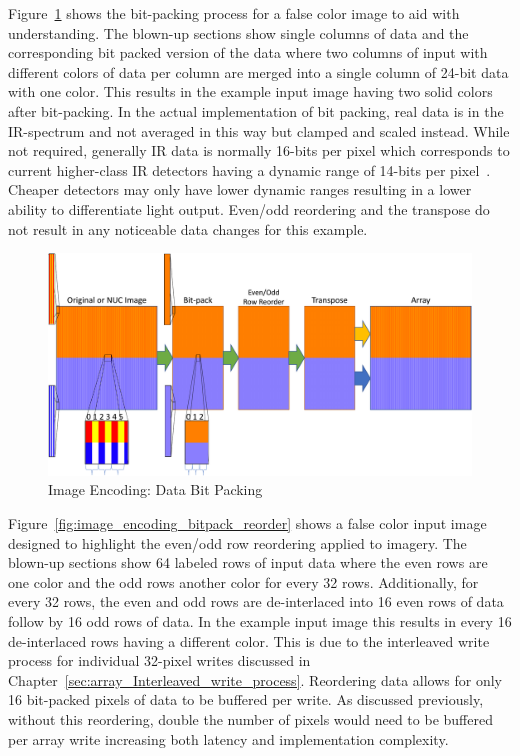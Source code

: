     Figure~\ref{fig:image_encoding_bitback} shows the bit-packing process for a false color image to aid with understanding. The blown-up sections show single columns of data and the corresponding bit packed version of the data where two columns of input with different colors of data per column are merged into a single column of 24-bit data with one color. This results in the example input image having two solid colors after bit-packing. In the actual implementation of bit packing, real data is in the IR-spectrum and not averaged in this way but clamped and scaled instead. While not required, generally IR data is normally 16-bits per pixel which corresponds to current higher-class IR detectors having a dynamic range of 14-bits per pixel~\cite{FLIR2014_1, FLIR2014_2, FLIR2016}. Cheaper detectors may only have lower dynamic ranges resulting in a lower ability to differentiate light output. Even/odd reordering and the transpose do not result in any noticeable data changes for this example.

    \begin{figure}
        \centering
        \includegraphics[width=1.0\textwidth]{fig/image_encoding_bitback.pdf}
        \caption{Image Encoding: Data Bit Packing}
        \label{fig:image_encoding_bitback}
    \end{figure}

    Figure~\ref{fig:image_encoding_bitpack_reorder} shows a false color input image designed to highlight the even/odd row reordering applied to imagery. The blown-up sections show 64 labeled rows of input data where the even rows are one color and the odd rows another color for every 32 rows. Additionally, for every 32 rows, the even and odd rows are de-interlaced into 16 even rows of data follow by 16 odd rows of data. In the example input image this results in every 16 de-interlaced rows having a different color. This is due to the interleaved write process for individual 32-pixel writes discussed in Chapter~\ref{sec:array_Interleaved_write_process}. Reordering data allows for only 16 bit-packed pixels of data to be buffered per write. As discussed previously, without this reordering, double the number of pixels would need to be buffered per array write increasing both latency and implementation complexity.

